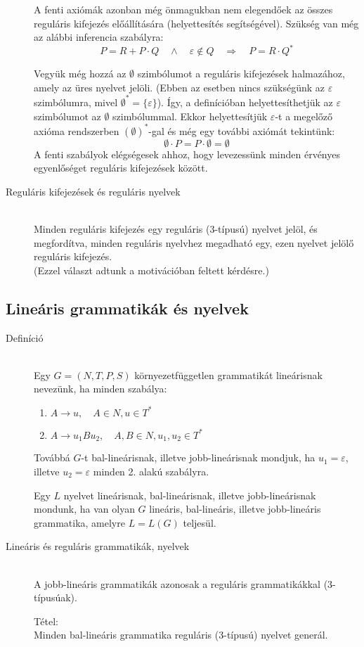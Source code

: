 \documentclass[margin=0px]{article}
\begin{document}
\begin{description}
					A fenti axiómák azonban még önmagukban nem elegendőek az összes reguláris kifejezés előállítására (helyettesítés segítségével). Szükség van még az alábbi inferencia szabályra:
					\[P=R+P\cdot Q \quad \land \quad \varepsilon \notin Q \quad \Longrightarrow \quad P = R\cdot Q^*\]
					
					Vegyük még hozzá az $\emptyset$ szimbólumot a reguláris kifejezések halmazához, amely az üres nyelvet jelöli. (Ebben az esetben nincs szükségünk az $\varepsilon$ szimbólumra, mivel $\emptyset^* = \{\varepsilon\}$). Így, a definícióban helyettesíthetjük az $\varepsilon$ szimbólumot az $\emptyset$ szimbólummal. Ekkor helyettesítjük $\varepsilon$-t a megelőző axióma rendszerben $(\emptyset)^*$-gal és még egy további
					axiómát tekintünk:
					\[\emptyset\cdot P = P\cdot\emptyset = \emptyset\]
					A fenti szabályok elégségesek ahhoz, hogy levezessünk minden érvényes egyenlőséget
					reguláris kifejezések között.
				\item[Reguláris kifejezések és reguláris nyelvek] \hfill \\
					Minden reguláris kifejezés egy reguláris (3-típusú) nyelvet jelöl, és megfordítva, minden reguláris nyelvhez megadható egy, ezen nyelvet jelölő reguláris kifejezés.\\ (Ezzel választ adtunk a motivációban feltett kérdésre.)
			\end{description}
			\subsection{Lineáris grammatikák és nyelvek}
				\begin{description}
					\item[Definíció] \hfill \\
						Egy $G=(N,T,P,S)$ környezetfüggetlen grammatikát lineárisnak nevezünk, ha minden szabálya:
						\begin{enumerate}
							\item $A\rightarrow u, \quad A \in N, u \in T^*$
							\item $A\rightarrow u_1Bu_2, \quad A,B\in N, u_1,u_2 \in T^*$
						\end{enumerate}
						Továbbá $G$-t bal-lineárisnak, illetve jobb-lineárisnak mondjuk, ha $u_1 = \varepsilon$, illetve $u_2 = \varepsilon$ minden 2. alakú szabályra.
						
						Egy $L$ nyelvet lineárisnak, bal-lineárisnak, illetve jobb-lineárisnak mondunk,
						ha van olyan $G$ lineáris, bal-lineáris, illetve jobb-lineáris grammatika,
						amelyre $L = L(G)$ teljesül.
					\item[Lineáris és reguláris grammatikák, nyelvek] \hfill \\
						A jobb-lineáris grammatikák azonosak a reguláris grammatikákkal (3-típusúak).
						
						Tétel: \\
						Minden bal-lineáris grammatika reguláris (3-típusú) nyelvet generál.
				\end{description}
\end{document}
